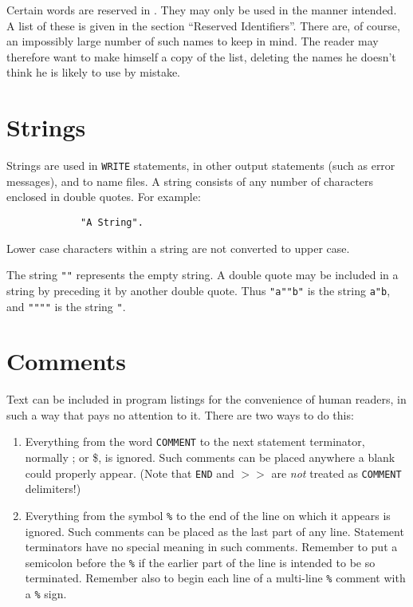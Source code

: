 Certain words are reserved in {\REDUCE}. They may only be used in the manner
intended. A list of these is given in the section ``Reserved Identifiers''.
There are, of course, an impossibly large number of such names to keep in
mind. The reader may therefore want to make himself a copy of the list,
deleting the names he doesn't think he is likely to use by mistake.

\section{Strings}

Strings are used in {\tt WRITE} statements, in other
output statements (such as error messages), and to name files.  A string
consists of any number of characters enclosed in double quotes.  For example:
\begin{verbatim}
             "A String".
\end{verbatim}
Lower case characters within a string are not converted to upper case.

The string {\tt ""} represents the empty string.  A double quote may be
included in a string by preceding it by another double quote.  Thus
{\tt "a""b"} is the string {\tt a"b}, and {\tt """"} is the string {\tt "}.

\hypertarget{comments}{\section{Comments}}

Text can be included in program listings for the
convenience of human readers, in such a way that {\REDUCE} pays no
attention to it.  There are two ways to do this:

\begin{enumerate}
\item Everything from the word {\tt COMMENT} to the next
statement terminator, normally ; or \$, is ignored.  Such comments
can be placed anywhere a blank could properly appear. (Note that {\tt END}
and $>>$ are {\em not\/} treated as {\tt COMMENT} delimiters!)

\item Everything from the symbol {\tt \%} to the end
of the line on which it appears is ignored.  Such comments can be placed
as the last part of any line.  Statement terminators have no special
meaning in such comments.  Remember to put a semicolon before the {\tt \%}
if the earlier part of the line is intended to be so terminated.  Remember
also to begin each line of a multi-line {\tt \%} comment with a {\tt \%}
sign.
\end{enumerate}

